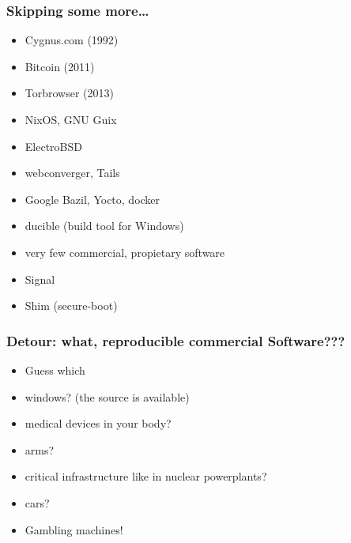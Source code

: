 \documentclass[14pt,aspectratio=169]{beamer}
\begin{document}
\begin{frame}
 \frametitle{Skipping some more…}
 \begin{itemize}
\item Cygnus.com (1992)
\item Bitcoin (2011)
\item Torbrowser (2013)
\item<2-3> NixOS, GNU Guix
\item<2-3> ElectroBSD
\item<2-3> webconverger, Tails
\item<2-3> Google Bazil, Yocto, docker
\item<3> ducible (build tool for Windows)
\item<3> very few commercial, propietary software
\item<3> Signal
\item<3> Shim (secure-boot)
 \end{itemize}
\end{frame}


\begin{frame}
 \frametitle{Detour: what, reproducible commercial Software???}
 \begin{itemize}
\item Guess which
\item <2-3>   windows? (the source is available)
\item <2-3>   medical devices in your body?
\item <2-3>   arms?
\item <2-3>   critical infrastructure like in nuclear powerplants?
\item <2-3>   cars?
\item <3> Gambling machines!
 \end{itemize}
\end{frame}
\end{document}
